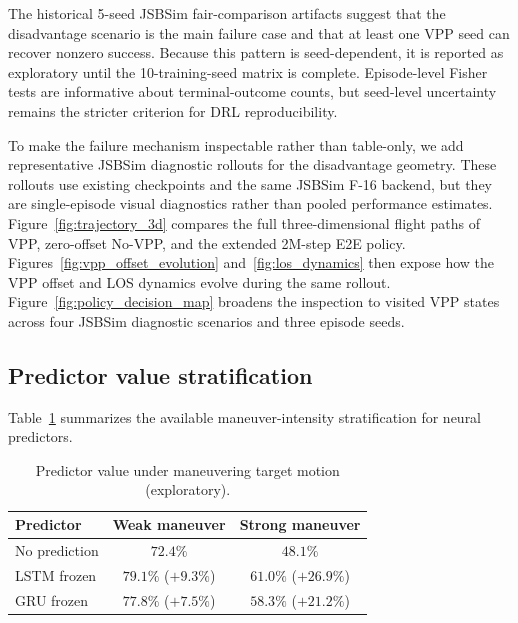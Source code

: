 













The historical 5-seed JSBSim fair-comparison artifacts suggest that the disadvantage scenario is the main failure case and that at least one VPP seed can recover nonzero success. Because this pattern is seed-dependent, it is reported as exploratory until the 10-training-seed matrix is complete. Episode-level Fisher tests are informative about terminal-outcome counts, but seed-level uncertainty remains the stricter criterion for DRL reproducibility.

To make the failure mechanism inspectable rather than table-only, we add representative JSBSim diagnostic rollouts for the disadvantage geometry. These rollouts use existing checkpoints and the same JSBSim F-16 backend, but they are single-episode visual diagnostics rather than pooled performance estimates. Figure~\ref{fig:trajectory_3d} compares the full three-dimensional flight paths of VPP, zero-offset No-VPP, and the extended 2M-step E2E policy. Figures~\ref{fig:vpp_offset_evolution} and~\ref{fig:los_dynamics} then expose how the VPP offset and LOS dynamics evolve during the same rollout. Figure~\ref{fig:policy_decision_map} broadens the inspection to visited VPP states across four JSBSim diagnostic scenarios and three episode seeds.









\subsection{Predictor value stratification}\label{sec:predictor}

Table~\ref{tab:predictor_stratification} summarizes the available maneuver-intensity stratification for neural predictors.

\begin{table}[t]
\centering
\caption{Predictor value under maneuvering target motion (exploratory).}
\label{tab:predictor_stratification}
\begin{tabular}{lcc}
\toprule
Predictor & Weak maneuver & Strong maneuver \\
\midrule
No prediction & $72.4\%$ & $48.1\%$ \\
LSTM frozen & $79.1\%$ ($+9.3\%$) & $61.0\%$ ($+26.9\%$) \\
GRU frozen & $77.8\%$ ($+7.5\%$) & $58.3\%$ ($+21.2\%$) \\
\bottomrule
\end{tabular}
\end{table}


